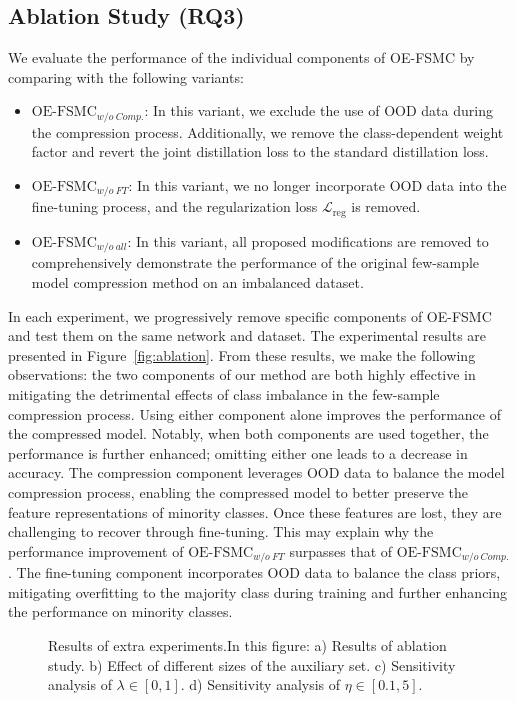 \documentclass[twoside,11pt]{article}
\begin{document}
\subsection{Ablation Study (RQ3)}
We evaluate the performance of the individual components of OE-FSMC by comparing with the following variants:
\begin{itemize}
    \item $\text{OE-FSMC}_{w/o\ Comp.}$: In this variant, we exclude the use of OOD data during the compression process. Additionally, we remove the class-dependent weight factor and revert the joint distillation loss to the standard distillation loss.
    \item $\text{OE-FSMC}_{w/o\ FT}$: In this variant, we no longer incorporate OOD data into the fine-tuning process, and the regularization loss $\mathcal{L}_{\text{reg}}$ is removed.
    \item $\text{OE-FSMC}_{w/o\ all}$: In this variant, all proposed modifications are removed to comprehensively demonstrate the performance of the original few-sample model compression method on an imbalanced dataset.
\end{itemize}

In each experiment, we progressively remove specific components of OE-FSMC and test them on the same network and dataset. The experimental results are presented in Figure~\ref{fig:ablation}. From these results, we make the following observations: the two components of our method are both highly effective in mitigating the detrimental effects of class imbalance in the few-sample compression process. Using either component alone improves the performance of the compressed model. Notably, when both components are used together, the performance is further enhanced; omitting either one leads to a decrease in accuracy. The compression component leverages OOD data to balance the model compression process, enabling the compressed model to better preserve the feature representations of minority classes. Once these features are lost, they are challenging to recover through fine-tuning. This may explain why the performance improvement of $\text{OE-FSMC}_{w/o\ FT}$ surpasses that of $\text{OE-FSMC}_{w/o\ Comp.}$. The fine-tuning component incorporates OOD data to balance the class priors, mitigating overfitting to the majority class during training and further enhancing the performance on minority classes.

\begin{figure}[t]
	\centering
    \vfill %
\caption{Results of extra experiments.In this figure: a) Results of ablation study. b) Effect of different sizes of the auxiliary set. c) Sensitivity analysis of $\lambda \in [0, 1]$. d) Sensitivity analysis of $\eta \in [0.1, 5]$. }
\end{figure}
\end{document}
